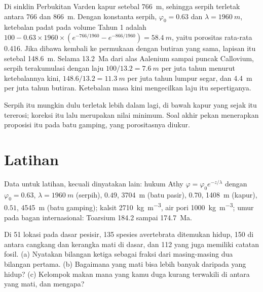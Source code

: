 \begin{example}\label{ex:b2:palaeoenvironments:shale}
Di sinklin Perbukitan Varden kapur setebal \qty{766}{m}, sehingga serpih terletak antara
766 dan \qty{866}{m}. Dengan konstanta serpih, $\varphi_0 = 0.63$ dan $\lambda =
\qty{1960}{m}$, ketebalan padat pada volume Tahun 1 adalah $100 - 0.63 \times 1960 \times
(e^{-766/1960} - e^{-866/1960}) = \qty{58.4}{m}$, yaitu porositas rata-rata 0.416. Jika dibawa kembali ke
permukaan dengan butiran yang sama, lapisan itu setebal \qty{148.6}{m}. Selama \qty{13.2}{Ma} dari
alas Aalenium sampai puncak Callovium, serpih terakumulasi dengan laju $100/13.2 =
\qty{7.6}{m}$ per juta tahun menurut ketebalannya kini, $148.6/13.2 = \qty{11.3}{m}$ per juta
tahun lumpur segar, dan \qty{4.4}{m} per juta tahun butiran. Ketebalan masa kini
mengecilkan laju itu sepertiganya.
\end{example}

Serpih itu mungkin dulu terletak lebih dalam lagi, di bawah kapur yang sejak itu tererosi; koreksi itu lalu merupakan
nilai minimum. Soal akhir pekan menerapkan proposisi itu pada batu gamping, yang porositasnya
diukur.

\section*{Latihan}\label{sec:b2:palaeoenvironments:exercises}

Data untuk latihan, kecuali dinyatakan lain: hukum Athy $\varphi = \varphi_0 e^{-z/\lambda}$
dengan $\varphi_0 = 0.63$, $\lambda = \qty{1960}{m}$ (serpih), $0.49$, \qty{3704}{m} (batu pasir),
$0.70$, \qty{1408}{m} (kapur), $0.51$, \qty{4545}{m} (batu gamping); kalsit \qty{2710}{kg.m^{-3}},
air pori \qty{1000}{kg.m^{-3}}; umur pada bagan internasional: Toarsium 184.2 sampai
\qty{174.7}{Ma}.

\begin{exercise}[$\star$]\label{exo:b2:palaeoenvironments:1}
Di 51 lokasi pada dasar pesisir, 135 spesies avertebrata ditemukan hidup, 150 di antara cangkang dan
kerangka mati di dasar, dan 112 yang juga memiliki catatan fosil. (a) Nyatakan bilangan
ketiga sebagai fraksi dari masing-masing dua bilangan pertama. (b) Bagaimana yang mati bisa lebih banyak daripada yang hidup? (c)
Kelompok makan mana yang kamu duga kurang terwakili di antara yang mati, dan mengapa?
\end{exercise}


